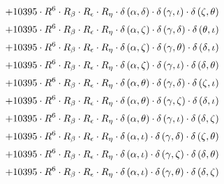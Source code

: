 \begin{subequations}
\begin{gather}
 \\[0.2em] \notag 		 + 10395 \cdot R^{6} \cdot R_{\beta{}} \cdot R_{\epsilon{}} \cdot R_{\eta{}} \cdot \delta{}\left(\alpha{}, \delta{}\right) \cdot \delta{}\left(\gamma{}, \iota{}\right) \cdot \delta{}\left(\zeta{}, \theta{}\right) 
 \\[0.2em] \notag 		 + 10395 \cdot R^{6} \cdot R_{\beta{}} \cdot R_{\epsilon{}} \cdot R_{\eta{}} \cdot \delta{}\left(\alpha{}, \zeta{}\right) \cdot \delta{}\left(\gamma{}, \delta{}\right) \cdot \delta{}\left(\theta{}, \iota{}\right) 
 \\[0.2em] \notag 		 + 10395 \cdot R^{6} \cdot R_{\beta{}} \cdot R_{\epsilon{}} \cdot R_{\eta{}} \cdot \delta{}\left(\alpha{}, \zeta{}\right) \cdot \delta{}\left(\gamma{}, \theta{}\right) \cdot \delta{}\left(\delta{}, \iota{}\right) 
 \\[0.2em] \notag 		 + 10395 \cdot R^{6} \cdot R_{\beta{}} \cdot R_{\epsilon{}} \cdot R_{\eta{}} \cdot \delta{}\left(\alpha{}, \zeta{}\right) \cdot \delta{}\left(\gamma{}, \iota{}\right) \cdot \delta{}\left(\delta{}, \theta{}\right) 
 \\[0.2em] \notag 		 + 10395 \cdot R^{6} \cdot R_{\beta{}} \cdot R_{\epsilon{}} \cdot R_{\eta{}} \cdot \delta{}\left(\alpha{}, \theta{}\right) \cdot \delta{}\left(\gamma{}, \delta{}\right) \cdot \delta{}\left(\zeta{}, \iota{}\right) 
 \\[0.2em] \notag 		 + 10395 \cdot R^{6} \cdot R_{\beta{}} \cdot R_{\epsilon{}} \cdot R_{\eta{}} \cdot \delta{}\left(\alpha{}, \theta{}\right) \cdot \delta{}\left(\gamma{}, \zeta{}\right) \cdot \delta{}\left(\delta{}, \iota{}\right) 
 \\[0.2em] \notag 		 + 10395 \cdot R^{6} \cdot R_{\beta{}} \cdot R_{\epsilon{}} \cdot R_{\eta{}} \cdot \delta{}\left(\alpha{}, \theta{}\right) \cdot \delta{}\left(\gamma{}, \iota{}\right) \cdot \delta{}\left(\delta{}, \zeta{}\right) 
 \\[0.2em] \notag 		 + 10395 \cdot R^{6} \cdot R_{\beta{}} \cdot R_{\epsilon{}} \cdot R_{\eta{}} \cdot \delta{}\left(\alpha{}, \iota{}\right) \cdot \delta{}\left(\gamma{}, \delta{}\right) \cdot \delta{}\left(\zeta{}, \theta{}\right) 
 \\[0.2em] \notag 		 + 10395 \cdot R^{6} \cdot R_{\beta{}} \cdot R_{\epsilon{}} \cdot R_{\eta{}} \cdot \delta{}\left(\alpha{}, \iota{}\right) \cdot \delta{}\left(\gamma{}, \zeta{}\right) \cdot \delta{}\left(\delta{}, \theta{}\right) 
 \\[0.2em] \notag 		 + 10395 \cdot R^{6} \cdot R_{\beta{}} \cdot R_{\epsilon{}} \cdot R_{\eta{}} \cdot \delta{}\left(\alpha{}, \iota{}\right) \cdot \delta{}\left(\gamma{}, \theta{}\right) \cdot \delta{}\left(\delta{}, \zeta{}\right) 

\end{gather}
\end{subequations}
